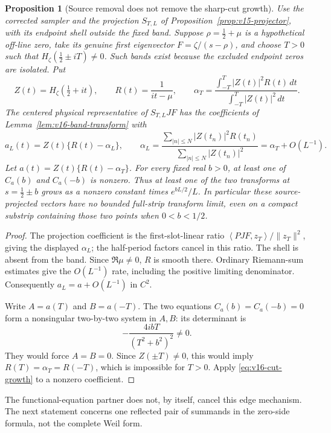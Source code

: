 \documentclass[11pt]{article}
\newtheorem{proposition}[theorem]{Proposition}
\theoremstyle{remark}
\newcommand{\ip}[2]{\left\langle #1,#2\right\rangle}
\begin{document}
\begin{proposition}[Source removal does not remove the sharp-cut growth]
\label{prop:v16-projected-cut}
Use the corrected sampler and the projection $S_{T,L}$ of
Proposition~\ref{prop:v15-projector}, with its endpoint shell outside
the fixed band. Suppose $\rho=\tfrac12+\mu$ is a hypothetical off-line
zero, take its genuine first eigenvector $F=\zeta/(s-\rho)$, and choose
$T>0$ such that $H_\zeta(\tfrac12\pm iT)\ne0$. Such bands exist
because the excluded endpoint zeros are isolated. Put
\[
 Z(t)=H_\zeta(\tfrac12+it),\qquad R(t)=\frac1{it-\mu},\qquad
 \alpha_T=\frac{\int_{-T}^T |Z(t)|^2R(t)\,dt}
                 {\int_{-T}^T |Z(t)|^2\,dt}.
\]
The centered physical representative of $S_{T,L}JF$ has the coefficients
of Lemma~\ref{lem:v16-band-transform} with
\[
 a_L(t)=Z(t)\{R(t)-\alpha_L\},\qquad
 \alpha_L=\frac{\sum_{|n|\le N}|Z(t_n)|^2R(t_n)}
                   {\sum_{|n|\le N}|Z(t_n)|^2}
 =\alpha_T+O(L^{-1}).
\]
Let $a(t)=Z(t)\{R(t)-\alpha_T\}$. For every fixed real $b>0$,
at least one of $C_a(b)$ and $C_a(-b)$ is nonzero. Thus at least one
of the two transforms at $s=\tfrac12\pm b$ grows as a nonzero
constant times $e^{bL/2}/L$. In particular these source-projected
vectors have no bounded full-strip transform limit, even on a compact
substrip containing those two points when $0<b<1/2$.
\end{proposition}
\begin{proof}
The projection coefficient is the first-slot-linear ratio
$\ip{PJF}{z_T}/\|z_T\|^2$, giving the displayed $\alpha_L$; the
half-period factors cancel in this ratio. The shell is absent from the
band. Since $\Re\mu\ne0$, $R$ is smooth there. Ordinary Riemann-sum
estimates give the $O(L^{-1})$ rate, including the positive limiting
denominator. Consequently $a_L=a+O(L^{-1})$ in $C^2$.

Write $A=a(T)$ and $B=a(-T)$. The two equations
$C_a(b)=C_a(-b)=0$ form a nonsingular two-by-two system in $A,B$:
its determinant is
\[
 -\frac{4ibT}{(T^2+b^2)^2}\ne0.
\]
They would force $A=B=0$. Since $Z(\pm T)\ne0$, this would imply
$R(T)=\alpha_T=R(-T)$, which is impossible for $T>0$.
Apply \eqref{eq:v16-cut-growth} to a nonzero coefficient.
\end{proof}

The functional-equation partner does not, by itself, cancel this edge
mechanism. The next statement concerns one reflected pair of summands in
the zero-side formula, not the complete Weil form.
\end{document}
